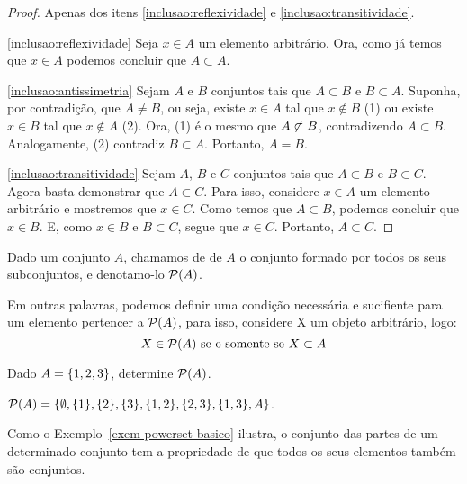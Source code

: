 \begin{proof}
	Apenas dos itens \ref{inclusao:reflexividade} e \ref{inclusao:transitividade}.

	\ref{inclusao:reflexividade}
	Seja $x \in A$ um elemento arbitrário.
	Ora, como já temos que $x \in A$ podemos concluir que $A \subset A$.

	\ref{inclusao:antissimetria}
	Sejam $A$ e $B$ conjuntos tais que $A \subset B$ e $B \subset A$.
	Suponha, por contradição, que $A \ne B$, ou seja, existe $x \in A$ tal que $x \notin B$ (1) ou existe $x \in B$ tal que $x \notin A$ (2).
	Ora, (1) é o mesmo que $A \not\subset B$, contradizendo $A \subset B$.
	Analogamente, (2) contradiz $B \subset A$.
	Portanto, $A = B$.

	\ref{inclusao:transitividade}
	Sejam $A$, $B$ e $C$ conjuntos tais que $A \subset B$ e $B \subset C$.
	Agora basta demonstrar que $A \subset C$.
	Para isso, considere $x \in A$ um elemento arbitrário e mostremos que $x \in C$.
	Como temos que $A \subset B$, podemos concluir que $x \in B$.
	E, como $x \in B$ e $B \subset C$, segue que $x \in C$.
	Portanto, $A \subset C$.
\end{proof}

\begin{definition}
\label{def:powerset}
Dado um conjunto $A$, chamamos de  de $A$ o conjunto formado por todos os seus subconjuntos, e denotamo-lo $\mathcal{P}(A)$.
\end{definition}

Em outras palavras, podemos definir uma condição necessária e sucifiente para um elemento pertencer a $\mathcal{P}(A)$, para isso, considere X um objeto arbitrário, logo:
$$ X \in \mathcal{P}(A) \text{ se e somente se } X \subset A $$

\begin{example}
\label{exem-powerset-basico}
Dado $A = \left\{ 1,2,3\right\}$, determine $\mathcal{P}(A)$.
\end{example}

\begin{solution}

$\mathcal{P}(A)=\{\emptyset,\{1\}, \{2\}, \{3\}, \{1,2\}, \{2,3\}, \{1,3\},A\}$.
\end{solution}

\begin{remark}
Como o Exemplo~\ref{exem-powerset-basico} ilustra, o conjunto das partes de um determinado conjunto tem a propriedade de que todos os seus elementos também são conjuntos.
\end{remark}
